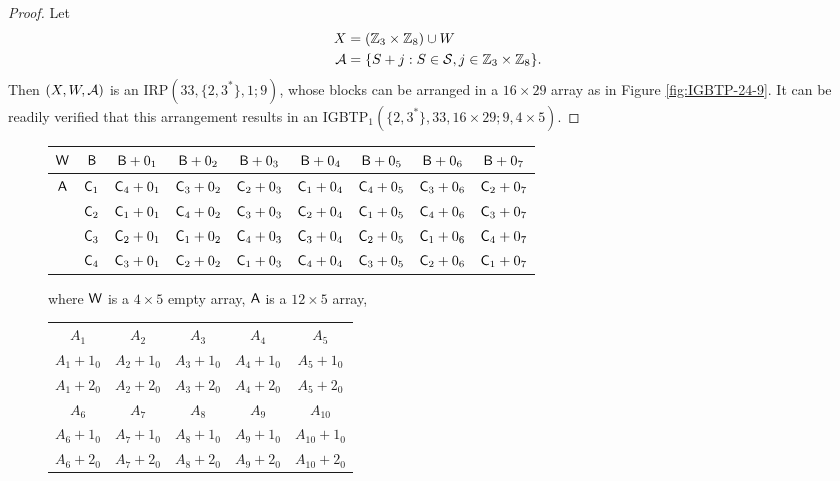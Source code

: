 \documentclass[draft, 11pt]{article}
\begin{document}
\begin{proof}
Let \begin{align*}
 X &= (\mathbb Z_3\times \mathbb Z_8) \cup W\\
 \mathcal A &=\{S+j: S\in\mathcal S, j\in\mathbb Z_3\times\mathbb Z_8\}.
 \end{align*}
 Then $(X,W,\mathcal A)$ is an IRP$(33,\{2,3^*\},1;9)$, whose blocks can be arranged in a $16\times 29$ array as in Figure \ref{fig:IGBTP-24-9}.
 It can be readily verified that this arrangement results in an IGBTP$_1(\{2,3^*\},33,16\times 29; 9,4\times 5)$.
  \end{proof}
 
\begin{figure}
\renewcommand{\arraystretch}{2}
\setlength{\tabcolsep}{3pt} \centering



\begin{tabular}{|c| c|c|c|c| c|c|c|c|}
\hline
${\sf W}$				    & ${\sf B}$  & ${\sf B}+0_1$   & ${\sf B}+0_2$ & ${\sf B}+0_3$ & ${\sf B}+0_4$  & ${\sf B}+0_5$   & ${\sf B}+0_6$ & ${\sf B}+0_7$  \\\hline
\multirow{4}{*}{${\sf A}$} 
& ${\sf C}_1$  & ${\sf C}_4+0_1$  &  ${\sf C}_3+0_2$ & ${\sf C}_2+0_3$ & ${\sf C}_1+0_4$  & ${\sf C}_4+0_5$  &  ${\sf C}_3+0_6$ & ${\sf C}_2+0_7$  \\\cline{2-9}
& ${\sf C}_2$  & ${\sf C}_1+0_1$  &  ${\sf C}_4+0_2$ & ${\sf C}_3+0_3$ & ${\sf C}_2+0_4$  & ${\sf C}_1+0_5$  &  ${\sf C}_4+0_6$ & ${\sf C}_3+0_7$  \\\cline{2-9}
& ${\sf C}_3$  & ${\sf C}_2+0_1$  &  ${\sf C}_1+0_2$ & ${\sf C}_4+0_3$ & ${\sf C}_3+0_4$  & ${\sf C}_2+0_5$  &  ${\sf C}_1+0_6$ & ${\sf C}_4+0_7$  \\\cline{2-9}
& ${\sf C}_4$  & ${\sf C}_3+0_1$  &  ${\sf C}_2+0_2$ & ${\sf C}_1+0_3$ & ${\sf C}_4+0_4$  & ${\sf C}_3+0_5$  &  ${\sf C}_2+0_6$ & ${\sf C}_1+0_7$  \\\hline
\end{tabular}

\vskip 5pt

\flushleft where ${\sf W}$ is a $4\times 5$ empty array, ${\sf A}$ is a $12\times 5$ array,
\vskip 5pt

\renewcommand{\arraystretch}{1.2}
\setlength{\tabcolsep}{2pt} 
\centering 
{\small
\begin{tabular}{|ccccc|}
\hline
$A_1$ & $A_2$ & $A_3$ & $A_4$ & $A_5$ \\
$A_1+1_0$ & $A_2+1_0$ & $A_3+1_0$ & $A_4+1_0$ & $A_5+1_0$ \\
$A_1+2_0$ & $A_2+2_0$ & $A_3+2_0$ & $A_4+2_0$ & $A_5+2_0$ \\

$A_6$ & $A_7$ & $A_8$ & $A_9$ & $A_{10}$ \\
$A_6+1_0$ & $A_7+1_0$ & $A_8+1_0$ & $A_9+1_0$ & $A_{10}+1_0$ \\
$A_6+2_0$ & $A_7+2_0$ & $A_8+2_0$ & $A_9+2_0$ & $A_{10}+2_0$ \\


\end{tabular}}
\end{figure}
\end{document}
